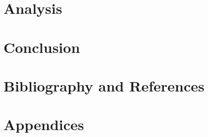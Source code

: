 \documentclass[11pt]{article} %
\begin{document}
\section{Analysis}
%
%


\section{Conclusion}
\section{Bibliography and References}
\nocite{*}


\appendix
\pagebreak
\section{Appendices}
\end{document}
